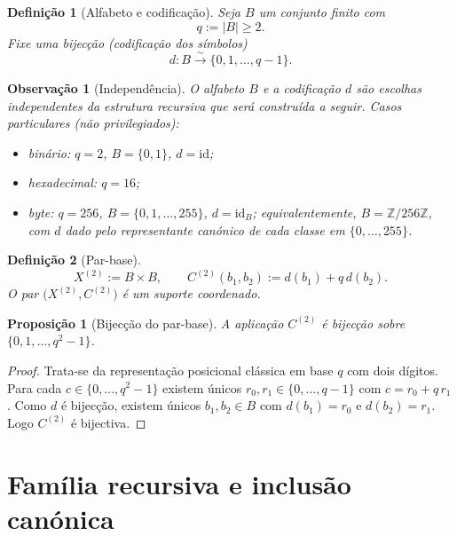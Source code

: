 \documentclass[11pt,a4paper]{article}
\newtheorem{definicao}{Definição}
\newtheorem{proposicao}{Proposição}
\newtheorem{observacao}{Observação}
\begin{document}
\begin{definicao}[Alfabeto e codificação]
\label{def:alfabeto}
Seja \(B\) um conjunto finito com
\[
q := \lvert B\rvert \ge 2.
\]
Fixe uma bijecção (codificação dos símbolos)
\[
d\colon B\overset{\sim}{\longrightarrow}\{0,1,\dots,q-1\}.
\]
\end{definicao}

\begin{observacao}[Independência]
\label{obs:independencia-alfabeto}
O alfabeto \(B\) e a codificação \(d\) são escolhas independentes da
estrutura recursiva que será construída a seguir.
Casos particulares (não privilegiados):
\begin{itemize}[leftmargin=1.5em]
\item binário: \(q=2\), \(B=\{0,1\}\), \(d=\mathrm{id}\);
\item hexadecimal: \(q=16\);
\item byte: \(q=256\), \(B=\{0,1,\dots,255\}\), \(d=\mathrm{id}_B\);
equivalentemente, \(B=\mathbb Z/256\mathbb Z\), com \(d\) dado pelo
representante canónico de cada classe em \(\{0,\dots,255\}\).
\end{itemize}
\end{observacao}

\begin{definicao}[Par-base]
\label{def:par-base}
\[
X^{(2)} := B\times B,
\qquad
C^{(2)}(b_1,b_2) := d(b_1) + q\, d(b_2).
\]
O par \(\bigl(X^{(2)},C^{(2)}\bigr)\) é um suporte coordenado.
\end{definicao}

\begin{proposicao}[Bijecção do par-base]
\label{prop:bijecao-base}
A aplicação \(C^{(2)}\) é bijecção sobre \(\{0,1,\dots,q^2-1\}\).
\end{proposicao}

\begin{proof}
Trata-se da representação posicional clássica em base \(q\) com dois
dígitos.
Para cada \(c\in\{0,\dots,q^2-1\}\) existem únicos \(r_0,r_1\in\{0,\dots,q-1\}\)
com \(c=r_0+q\,r_1\).
Como \(d\) é bijecção, existem únicos \(b_1,b_2\in B\) com
\(d(b_1)=r_0\) e \(d(b_2)=r_1\).
Logo \(C^{(2)}\) é bijectiva.
\end{proof}

\section{Família recursiva e inclusão canónica}
\label{sec:familia}
\end{document}
